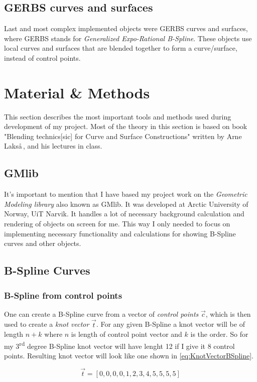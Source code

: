\documentclass[a4paper,12pt]{extarticle}
\begin{document}
\subsection{GERBS curves and surfaces}
Last and most complex implemented objects were GERBS curves and surfaces, where GERBS stands for \emph{Generalized Expo-Rational B-Spline}. These objects use local curves and surfaces that are blended together to form a curve/surface, instead of control points.

\section{Material \& Methods}
This section describes the most important tools and methods used during development of my project. Most of the theory in this section is based on book "Blending technics[sic] for Curve and Surface Constructions" written by Arne Laks\aa \,\citep{Laksa2012}, and his lectures in class.

\subsection{GMlib}
It's important to mention that I have based my project work on the \emph{Geometric Modeling library} also known as GMlib. It was developed at Arctic University of Norway, UiT Narvik. It handles a lot of necessary background calculation and rendering of objects on screen for me. This way I only needed to focus on implementing necessary functionality and calculations for showing B-Spline curves and other objects.

\subsection{B-Spline Curves}
\subsubsection{B-Spline from control points}
One can create a B-Spline curve from a vector of \emph{control points} $\vec{c}$, which is then used to create a \emph{knot vector} $\vec{t}$. For any given B-Spline a knot vector will be of length $n+k$ where $n$ is length of control point vector and $k$ is the order. So for my 3\textsuperscript{rd} degree B-Spline knot vector will have lenght 12 if I give it 8 control points. Resulting knot vector will look like one shown in \cref{eq:KnotVectorBSpline}.

\begin{equation}
\vec{t}= [0,0,0,0,1,2,3,4,5,5,5,5]
\label{eq:KnotVectorBSpline}
\end{equation}
\end{document}
